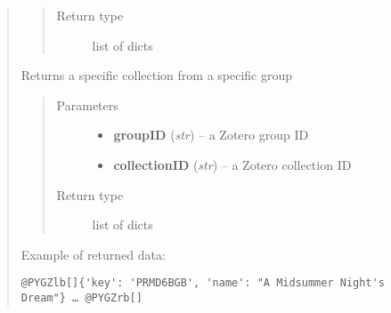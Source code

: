 \documentclass[letterpaper,10pt,english]{sphinxmanual}
\begin{document}
\begin{quote}
\begin{fulllineitems}
\begin{quote}
\begin{description}
\item[{Return type}] \leavevmode
list of dicts

\end{description}\end{quote}

\end{fulllineitems}



\begin{fulllineitems}
\label{index:pyzotero.zotero.Zotero.group_collection}
Returns a specific collection from a specific group
\begin{quote}\begin{description}
\item[{Parameters}] \leavevmode\begin{itemize}
\item {} 
\textbf{groupID} (\emph{str}) -- a Zotero group ID

\item {} 
\textbf{collectionID} (\emph{str}) -- a Zotero collection ID

\end{itemize}

\item[{Return type}] \leavevmode
list of dicts

\end{description}\end{quote}

\end{fulllineitems}


Example of returned data:

\begin{Verbatim}[commandchars=@\[\]]
@PYGZlb[]{'key': 'PRMD6BGB', 'name': "A Midsummer Night's Dream"} … @PYGZrb[]
\end{Verbatim}
\end{quote}
\end{document}
